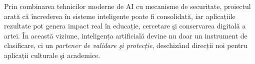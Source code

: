 Prin combinarea tehnicilor moderne de AI cu mecanisme de securitate, proiectul arată că încrederea în sisteme inteligente poate fi consolidată, iar aplicațiile rezultate pot genera impact real în educație, cercetare şi conservarea digitală a artei. În această viziune, inteligența artificială devine nu doar un instrument de clasificare, ci un \emph{partener de validare şi protecție}, deschizând direcții noi pentru aplicații culturale şi academice.